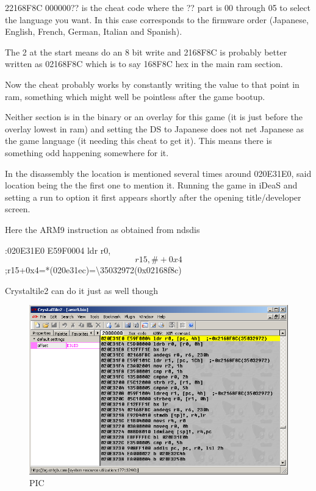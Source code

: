 \documentclass[
]{book}
\begin{document}
22168F8C 000000?? is the cheat code where the ?? part is 00 through 05 to select the language you want. In this case corresponds to the firmware order (Japanese, English, French, German, Italian and Spanish).

The 2 at the start means do an 8 bit write and 2168F8C is probably better written as 02168F8C which is to say 168F8C hex in the main ram section.

Now the cheat probably works by constantly writing the value to that point in ram, something which might well be pointless after the game bootup.

Neither section is in the binary or an overlay for this game (it is just before the overlay lowest in ram) and setting the DS to Japanese does not net Japanese as the game language (it needing this cheat to get it). This means there is something odd happening somewhere for it.

In the disassembly the location is mentioned several times around 020E31E0, said location being the the first one to mention it. Running the game in iDeaS and setting a run to option it first appears shortly after the opening title/developer screen.

Here the ARM9 instruction as obtained from ndsdis

:020E31E0 E59F0004 ldr r0,\[r15, \#+0x4\] ;r15+0x4=*(020e31ec)=\textbackslash35032972(0x02168f8c)

Crystaltile2 can do it just as well though

\begin{figure}
\centering
\includegraphics{images/217_home_fast6191_romhackingguide_unrenamed_fil___iginal_borders_romhackguideasmlanguagemod_2.png}
\caption{PIC}
\end{figure}
\end{document}
